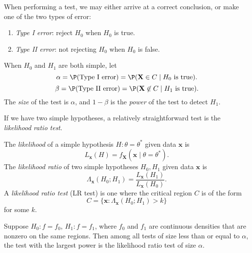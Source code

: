 \documentclass[a4paper]{article}
\begin{document}
When performing a test, we may either arrive at a correct conclusion, or make one of the two types of error:
\begin{defi}\leavevmode
  \begin{enumerate}
    \item \emph{Type I error}: reject $H_0$ when $H_0$ is true.
    \item \emph{Type II error}: not rejecting $H_0$ when $H_0$ is false.
  \end{enumerate}
\end{defi}

\begin{defi}
When $H_0$ and $H_1$ are both simple, let
\[
  \alpha = \P(\text{Type I error}) = \P(\mathbf{X}\in C\mid H_0\text{ is true}).
\]
\[
  \beta = \P(\text{Type II error}) = \P(\mathbf{X}\not\in C\mid H_1\text{ is true}).
\]
The \emph{size} of the test is $\alpha$, and $1 - \beta$ is the \emph{power} of the test to detect $H_1$.
\end{defi}

If we have two simple hypotheses, a relatively straightforward test is the \emph{likelihood ratio test}.
\begin{defi}[Likelihood]
  The \emph{likelihood} of a simple hypothesis $H: \theta = \theta^*$ given data $\mathbf{x}$ is
  \[
    L_\mathbf{x}(H) = f_\mathbf{X}(\mathbf{x}\mid \theta = \theta^*).
  \]
  The \emph{likelihood ratio} of two simple hypotheses $H_0, H_1$ given data $\mathbf{x}$ is
  \[
    \Lambda_\mathbf{x}(H_0; H_1) = \frac{L_\mathbf{x}(H_1)}{L_\mathbf{x}(H_0)}.
  \]
  A \emph{likelihood ratio test} (LR test) is one where the critical region $C$ is of the form
  \[
    C = \{\mathbf{x}: \Lambda_\mathbf{x} (H_0; H_1) > k\}
  \]
  for some $k$.
\end{defi}

\begin{lemma}
  Suppose $H_0: f = f_0$, $H_1: f = f_1$, where $f_0$ and $f_1$ are continuous densities that are nonzero on the same regions. Then among all tests of size less than or equal to $\alpha$, the test with the largest power is the likelihood ratio test of size $\alpha$.

\end{lemma}
\end{document}

